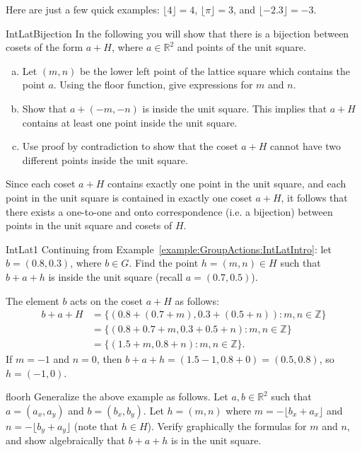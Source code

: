 Here are just a few quick examples: $\lfloor 4 \rfloor = 4$, $\lfloor \pi \rfloor = 3$, and $\lfloor -2.3 \rfloor = -3$.

\begin{exercise}{IntLatBijection} In the following you will show that there is a bijection between cosets of the form $a+H$, where $a\in\mathbb{R}^2$ and points of the unit square.
\begin{enumerate}[(a)]
\item Let $(m,n)$ be the lower left point of the lattice square which contains the point $a$. Using the floor function, give  expressions for $m$ and $n$.
\item Show that $a+(-m,-n)$ is inside the unit square. This implies that $a+H$ contains at least one point inside the unit square.
\item Use proof by contradiction to show that the coset $a+H$ cannot have two different points inside the unit square.
\end{enumerate}
Since each coset $a+H$ contains exactly one point in the unit square, and each point in the unit square is contained in exactly one coset $a+H$, it follows that there exists a one-to-one and onto correspondence (i.e. a bijection) between points in the unit square and cosets of $H$.
\end{exercise}

\begin{example}{IntLat1} Continuing from Example~\ref{example:GroupActions:IntLatIntro}: let $b=(0.8,0.3)$, where $b \in G$. Find the point $h=(m,n) \in H$ such that $b+a+h$ is inside the unit square (recall $a=(0.7,0.5)$).

The element $b$ acts on the coset $a+H$ as follows:  
\begin{align*}
 b+a+H &=\{(0.8+(0.7+m), 0.3+(0.5+n)):m, n \in \mathbb{Z}\}\\
&=\{(0.8+0.7+m, 0.3+0.5+n):m, n \in \mathbb{Z}\}\\
&=\{(1.5+m, 0.8+n):m, n \in \mathbb{Z}\}. 
\end{align*}
If $m=-1$ and $n=0$, then $b+a+h=(1.5-1,0.8+0)=(0.5,0.8)$, so $h=(-1,0)$.
\end{example}

\begin{exercise}{floorh} Generalize the above example as follows. Let $a,b \in \mathbb{R}^2$ such that $a=(a_x,a_y)$ and $b=(b_x,b_y)$. Let $h=(m,n)$ where $m=-\lfloor b_x+a_x \rfloor$ and $n=-\lfloor b_y+a_y \rfloor$ (note that $h \in H$). Verify graphically the formulas for $m$ and $n$, and show algebraically that $b+a+h$ is in the unit square.
\end{exercise}


